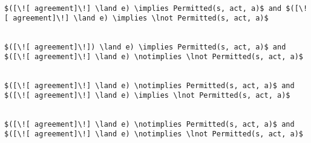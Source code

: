 \lstset{mathescape, language=AST} 
\begin{lstlisting}[frame=single, caption={Answerable Queries: Error},label={lst:errordecision}]

$([\![ agreement]\!] \land e) \implies Permitted(s, act, a)$ and $([\![ agreement]\!] \land e) \implies \lnot Permitted(s, act, a)$

\end{lstlisting}

\lstset{mathescape, language=AST} 
\begin{lstlisting}[frame=single, caption={Answerable Queries: Permit},label={lst:permitdecision}]

$([\![ agreement]\!]) \land e) \implies Permitted(s, act, a)$ and $([\![ agreement]\!] \land e) \notimplies \lnot Permitted(s, act, a)$

\end{lstlisting}

\lstset{mathescape, language=AST} 
\begin{lstlisting}[frame=single, caption={Answerable Queries: Deny},label={lst:denydecision}]

$([\![ agreement]\!] \land e) \notimplies Permitted(s, act, a)$ and $([\![ agreement]\!] \land e) \implies \lnot Permitted(s, act, a)$

\end{lstlisting}

\lstset{mathescape, language=AST} 
\begin{lstlisting}[frame=single, caption={Answerable Queries: Not Applicable},label={lst:notapplicabledecision}]

$([\![ agreement]\!] \land e) \notimplies Permitted(s, act, a)$ and $([\![ agreement]\!] \land e) \notimplies \lnot Permitted(s, act, a)$

\end{lstlisting}





















